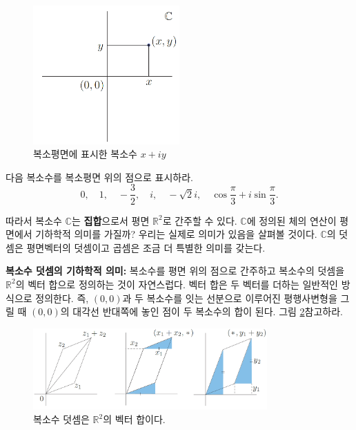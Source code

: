 \begin{figure}[!h]
\begin{center}
\includegraphics[width=0.5\textwidth]{./SaltChapter/figs/fig-1-2}
\end{center}
\caption{복소평면에 표시한 복소수 $x+iy$}
\label{fig-1-2}
\end{figure}


\begin{salt_exercise} \label{ex-1-4}
다음 복소수를 복소평면 위의 점으로 표시하라.
$$
0, \quad 1 , \quad -\frac32, \quad i, \quad -\sqrt{2}i,
\quad \cos \frac\pi3 + i\sin\frac\pi3.
$$
\end{salt_exercise}

따라서 복소수 $\mathbb C$는 {\bf 집합}으로서 평면 $\mathbb R^2$로 간주할 수 있다.
$\mathbb C$에 정의된 체의 연산이 평면에서 기하학적 의미를 가질까?
우리는 실제로 의미가 있음을 살펴볼 것이다.
$\mathbb C$의 덧셈은 평면벡터의 덧셈이고
곱셈은 조금 더 특별한 의미를 갖는다.

{\bf 복소수 덧셈의 기하학적 의미: }
복소수를 평면 위의 점으로 간주하고 복소수의 덧셈을 $\mathbb R^2$의 벡터 합으로 
정의하는 것이 자연스럽다. 
벡터 합은 두 벡터를 더하는 일반적인 방식으로 정의한다.
즉, $(0,0)$과 두 복소수를 잇는 선분으로 이루어진 평행사변형을 그릴 때
$(0,0)$의 대각선 반대쪽에 놓인 점이 두 복소수의 합이 된다.
그림 \ref{fig-1-3}\을 참고하라.

\begin{figure}[!h]
\begin{center}
\includegraphics[width=0.8\textwidth]{./SaltChapter/figs/fig-1-3}
\end{center}
\caption{복소수 덧셈은 $\mathbb R^2$의 벡터 합이다.}
\label{fig-1-3}
\end{figure}

